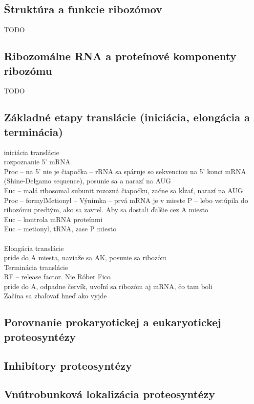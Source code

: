 \subsection{Štruktúra a funkcie ribozómov}
TODO
\subsection{Ribozomálne RNA a proteínové komponenty ribozómu}
TODO
\subsection{Základné etapy translácie (iniciácia, elongácia a terminácia)}
iniciácia translácie \\
\tab rozpoznanie 5' mRNA\\
\tab Proc -- na 5' nie je čiapočka -- rRNA sa spáruje so sekvenciou na 5' konci mRNA (Shine-Delgamo sequence), posunie sa a narazí na AUG \\
\tab Euc -- malá ribosomal subunit rozozná čiapočku, začne sa kĺzať, narazí na AUG \\
\tab Proc -- formylMetionyl -- Výnimka -- prvá mRNA je v mieste P -- lebo vstúpila do ribozómu predtým, ako sa zavrel. Aby sa dostali ďalšie cez A miesto\\
\tab Euc -- kontrola mRNA proteínmi\\
\tab Euc -- metionyl, tRNA, zase P miesto\\
\tab \\
Elongácia translácie\\
\tab príde do A miesta, naviaže sa AK, posunie sa ribozóm\\
Terminácia translácie\\
\tab RF -- release factor. Nie Róber Fico\\
\tab príde do A, odpadne červík, uvoľní sa ribozóm aj mRNA, čo tam boli\\
Začína sa zbaľovať hneď ako vyjde\\
\subsection{Porovnanie prokaryotickej a eukaryotickej proteosyntézy}

\subsection{Inhibítory proteosyntézy}

\subsection{Vnútrobunková lokalizácia proteosyntézy}

